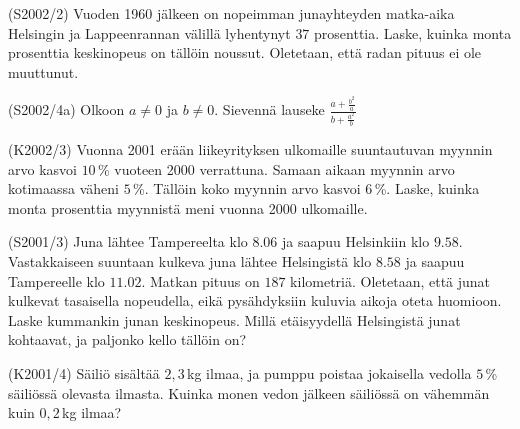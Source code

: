 \begin{tehtava}(S2002/2) Vuoden 1960 jälkeen on nopeimman junayhteyden matka-aika Helsingin ja Lappeenrannan välillä lyhentynyt $37$ prosenttia. Laske, kuinka monta prosenttia keskinopeus on tällöin noussut. Oletetaan, että radan pituus ei ole muuttunut.
\end{tehtava}

\begin{tehtava}(S2002/4a) Olkoon $ a \neq 0$ ja $b \neq 0 $. Sievennä lauseke
                        $
                            \frac{a + \frac{b^2}{a} } {b + \frac{a^2}{b} }
                        $
\end{tehtava}

\begin{tehtava}(K2002/3) Vuonna 2001 erään liikeyrityksen ulkomaille suuntautuvan myynnin arvo kasvoi $10$\,\% vuoteen 2000 verrattuna. Samaan aikaan myynnin arvo kotimaassa väheni $5$\,\%. Tällöin koko myynnin arvo kasvoi $6$\,\%. Laske, kuinka monta prosenttia myynnistä meni vuonna 2000 ulkomaille.
\end{tehtava}


\begin{tehtava}(S2001/3) Juna lähtee Tampereelta klo $8.06$ ja saapuu Helsinkiin klo $9.58$. Vastakkaiseen suuntaan kulkeva juna lähtee Helsingistä klo $8.58$ ja saapuu Tampereelle klo $11.02$. Matkan pituus on $187$ kilometriä. Oletetaan, että junat kulkevat tasaisella nopeudella, eikä pysähdyksiin kuluvia aikoja oteta huomioon. Laske kummankin junan keskinopeus. Millä etäisyydellä Helsingistä junat kohtaavat, ja paljonko kello tällöin on? 
\end{tehtava}

\begin{tehtava}(K2001/4) Säiliö sisältää $2,3$\,kg ilmaa, ja pumppu poistaa jokaisella vedolla $5$\,\% säiliössä olevasta ilmasta. Kuinka monen vedon jälkeen säiliössä on vähemmän kuin $0,2$\,kg ilmaa?
\end{tehtava}

